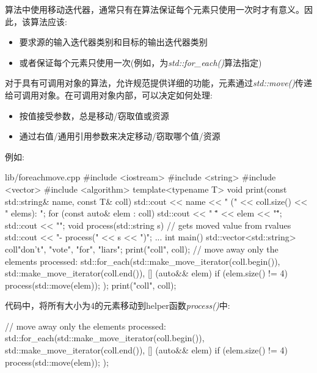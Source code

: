 
算法中使用移动迭代器，通常只有在算法保证每个元素只使用一次时才有意义。因此，该算法应该:\par

\begin{itemize}
  \item 要求源的输入迭代器类别和目标的输出迭代器类别
  \item 或者保证每个元素只使用一次(例如，为\textit{std::\allowbreak{}for\_\allowbreak{}each(\allowbreak{})\allowbreak{}}算法指定)
\end{itemize}

对于具有可调用对象的算法，允许规范提供详细的功能，元素通过\textit{std::move()}传递给可调用对象。在可调用对象内部，可以决定如何处理:\par

\begin{itemize}
  \item 按值接受参数，总是移动/窃取值或资源
  \item 通过右值/通用引用参数来决定移动/窃取哪个值/资源
\end{itemize}

例如:\par

\begin{codeboxt}[cpp]{lib/foreachmove.cpp}
#include <iostream>
#include <string>
#include <vector>
#include <algorithm>
template<typename T>
void print(const std::string& name, const T& coll)
{
  std::cout << name << " (" << coll.size() << " elems): ";
  for (const auto& elem : coll) {
    std::cout << " \"" << elem << "\"";
  }
  std::cout << "\n";
}
void process(std::string s) // gets moved value from rvalues
{
  std::cout << "- process(" << s << ")\n";
  ...
}
int main()
{
  std::vector<std::string> coll{"don't", "vote", "for", "liars"};
  print("coll", coll);
  // move away only the elements processed:
  std::for_each(std::make_move_iterator(coll.begin()),
  std::make_move_iterator(coll.end()),
  [] (auto&& elem) {
    if (elem.size() != 4) {
      process(std::move(elem));
    }
  });
  print("coll", coll);
}
\end{codeboxt}

代码中，将所有大小为4的元素移动到helper函数\textit{process()}中:\par

\begin{codebox}[cpp]
// move away only the elements processed:
std::for_each(std::make_move_iterator(coll.begin()),
std::make_move_iterator(coll.end()),
[] (auto&& elem) {
  if (elem.size() != 4) {
    process(std::move(elem));
  }
});
\end{codebox}

